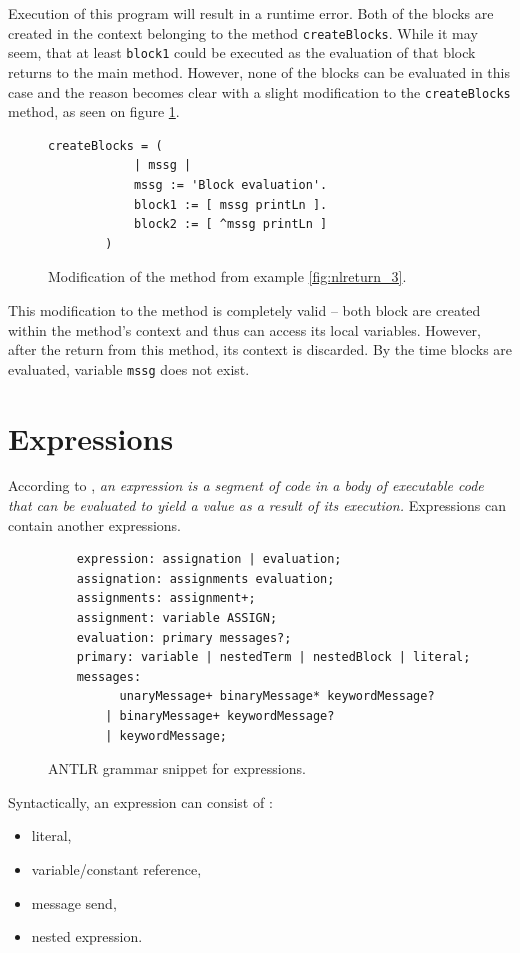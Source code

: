 \documentclass[thesis=M,english]{FITthesis}[2019/12/23]
\begin{document}
Execution of this program will result in a runtime error. Both of the blocks are created in the context belonging to the method
\texttt{createBlocks}. While it may seem, that at least \texttt{block1} could be executed as the evaluation of that block
returns to the main method. However, none of the blocks can be evaluated in this case and the reason becomes clear with a 
slight modification to the \texttt{createBlocks} method, as seen on figure \ref{fig:nlreturn_3_2}.

\begin{figure}[h!]
	\centering
	\begin{lstlisting}[language=Smalltalk]
		createBlocks = (
			| mssg |
			mssg := 'Block evaluation'.
			block1 := [ mssg printLn ].
			block2 := [ ^mssg printLn ]
		)
	\end{lstlisting}
	\caption{Modification of the method from example \ref{fig:nlreturn_3}.}
	\label{fig:nlreturn_3_2}
\end{figure}

This modification to the method is completely valid -- both block are created within the method's context and thus
can access its local variables. However, after the return from this method, its context is discarded. By the time
blocks are evaluated, variable \texttt{mssg} does not exist.

\section{Expressions}
According to \cite{smalltalk-essentials}, \textit{an expression is a segment of code in a body of executable code
that can be evaluated to yield a value as a result of its execution.} Expressions can contain another expressions.

\begin{figure}[h!]
	\begin{verbatim}
	expression: assignation | evaluation;
	assignation: assignments evaluation;
	assignments: assignment+;
	assignment: variable ASSIGN;
	evaluation: primary messages?;
	primary: variable | nestedTerm | nestedBlock | literal;
	messages:
		  unaryMessage+ binaryMessage* keywordMessage?
		| binaryMessage+ keywordMessage?
		| keywordMessage;
	\end{verbatim}
	\caption{ANTLR grammar snippet for expressions.}
	\label{fig:grammar_exp}
\end{figure}

Syntactically, an expression can consist of \cite{smalltalk-essentials}:
\begin{itemize}
	\item literal,
	\item variable/constant reference,
	\item message send,
	\item nested expression.
\end{itemize}
\end{document}
